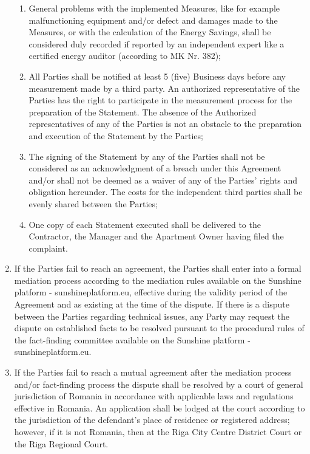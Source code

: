 \begin{multicols}{2}
\begin{enumerate}
\begin{enumerate}
		\item	General problems with the implemented Measures, like for example malfunctioning equipment and/or defect and damages made to the Measures, or with the calculation of the Energy Savings, shall be considered duly recorded if reported by an independent expert like a certified energy auditor (according to MK Nr. 382);
		\item	All Parties shall be notified at least 5 (five) Business days before any measurement made by a third party. An authorized representative of the Parties has the right to participate in the measurement process for the preparation of the Statement. The absence of the Authorized representatives of any of the Parties is not an obstacle to the preparation and execution of the Statement by the Parties;
		\item	The signing of the Statement by any of the Parties shall not be considered as an acknowledgment of a breach under this Agreement and/or shall not be deemed as a waiver of any of the Parties’ rights and obligation hereunder. The costs for the independent third parties shall be evenly shared between the Parties;
		\item	One copy of each Statement executed shall be delivered to the Contractor, the Manager and the Apartment Owner having filed the complaint.
	\end{enumerate}
	\item	If the Parties fail to reach an agreement, the Parties shall enter into a formal mediation process according to the mediation rules available on the Sunshine platform - sunshineplatform.eu, effective during the validity period of the Agreement and as existing at the time of the dispute. If there is a dispute between the Parties regarding technical issues, any Party may request the dispute on established facts to be resolved pursuant to the procedural rules of the fact-finding committee available on the Sunshine platform - sunshineplatform.eu.
	\item	If the Parties fail to reach a mutual agreement after the mediation process and/or fact-finding process the dispute shall be resolved by a court of general jurisdiction of Romania in accordance with applicable laws and regulations effective in Romania. An application shall be lodged at the court according to the jurisdiction of the defendant’s place of residence or registered address; however, if it is not Romania, then at the Riga City Centre District Court or the Riga Regional Court.
\end{enumerate}


\end{multicols}
